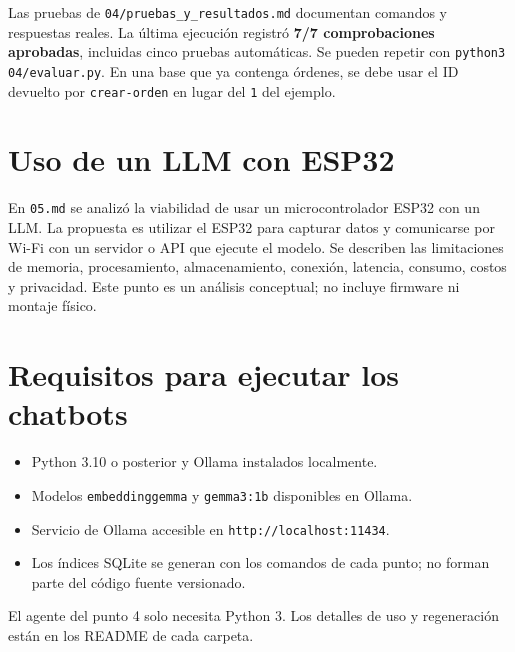 \documentclass[14pt,twoside]{article}
\begin{document}
Las pruebas de \texttt{04/pruebas\_y\_resultados.md} documentan comandos y respuestas reales. La última ejecución registró \textbf{7/7 comprobaciones aprobadas}, incluidas cinco pruebas automáticas. Se pueden repetir con \texttt{python3 04/evaluar.py}. En una base que ya contenga órdenes, se debe usar el ID devuelto por \texttt{crear-orden} en lugar del \texttt{1} del ejemplo.

\section{Uso de un LLM con ESP32}

En \texttt{05.md} se analizó la viabilidad de usar un microcontrolador ESP32 con un LLM. La propuesta es utilizar el ESP32 para capturar datos y comunicarse por Wi-Fi con un servidor o API que ejecute el modelo. Se describen las limitaciones de memoria, procesamiento, almacenamiento, conexión, latencia, consumo, costos y privacidad. Este punto es un análisis conceptual; no incluye firmware ni montaje físico.

\section{Requisitos para ejecutar los chatbots}

\begin{itemize}
\item Python 3.10 o posterior y Ollama instalados localmente.
\item Modelos \texttt{embeddinggemma} y \texttt{gemma3:1b} disponibles en Ollama.
\item Servicio de Ollama accesible en \texttt{http://localhost:11434}.
\item Los índices SQLite se generan con los comandos de cada punto; no forman parte del código fuente versionado.
\end{itemize}

El agente del punto 4 solo necesita Python 3. Los detalles de uso y regeneración están en los README de cada carpeta.
\end{document}
